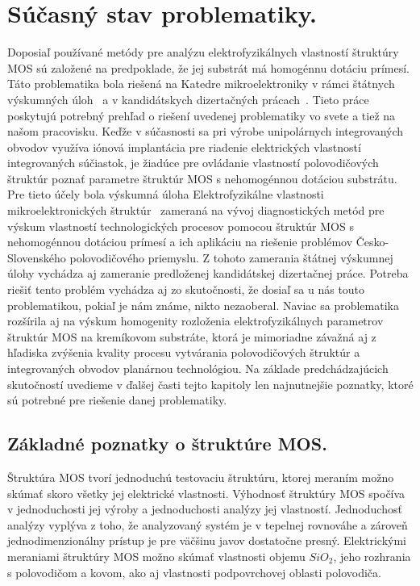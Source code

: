 
\chapter{Súčasný stav problematiky.}%
\label{Chapter1} %

Doposiaľ používané metódy pre analýzu elektrofyzikálnych vlastností
štruktúry MOS sú založené na predpoklade, že jej substrát má homogénnu
dotáciu prímesí. Táto problematika bola riešená na Katedre
mikroelektroniky v rámci štátnych výskumných úloh~\cite{1.1,1.2} a v
kandidátskych dizertačných prácach~\cite{1.5,1.6,1.7,1.8}. Tieto práce
poskytujú potrebný prehľad o riešení uvedenej problematiky vo svete a
tiež na našom pracovisku. Keďže v súčasnosti sa pri výrobe
unipolárnych integrovaných obvodov využíva iónová implantácia pre
riadenie elektrických vlastností integrovaných súčiastok, je žiadúce
pre ovládanie vlastností polovodičových štruktúr poznať parametre
štruktúr MOS s nehomogénnou dotáciou substrátu. Pre tieto účely bola
výskumná úloha Elektrofyzikálne vlastnosti mikroelektronických
štruktúr~\cite{1.3,1.4} zameraná na vývoj diagnostických metód pre
výskum vlastností technologických procesov pomocou štruktúr MOS s
nehomogénnou dotáciou prímesí a ich aplikáciu na riešenie problémov
Česko-Slovenského polovodičového priemyslu. Z tohoto zamerania štátnej
výskumnej úlohy vychádza aj zameranie predloženej kandidátskej
dizertačnej práce. Potreba riešiť tento problém vychádza aj zo
skutočnosti, že dosiaľ sa u nás touto problematikou, pokiaľ je nám
známe, nikto nezaoberal. Naviac sa problematika rozšírila aj na výskum
homogenity rozloženia elektrofyzikálnych parametrov štruktúr MOS na
kremíkovom substráte, ktorá je mimoriadne závažná aj z hľadiska
zvýšenia kvality procesu vytvárania polovodičových štruktúr a
integrovaných obvodov planárnou technológiou. Na základe
predchádzajúcich skutočností uvedieme v ďalšej časti tejto kapitoly
len najnutnejšie poznatky, ktoré sú potrebné pre riešenie danej
problematiky.

\section{Základné poznatky o štruktúre MOS.}

Štruktúra MOS tvorí jednoduchú testovaciu štruktúru, ktorej meraním
možno skúmať skoro všetky jej elektrické vlastnosti. Výhodnosť
štruktúry MOS spočíva v jednoduchosti jej výroby a jednoduchosti
analýzy jej vlastností. Jednoduchosť analýzy vyplýva z toho, že
analyzovaný systém je v tepelnej rovnováhe a zároveň
jednodimenzionálny prístup je pre väčšinu javov dostatočne
presný. Elektrickými meraniami štruktúry MOS možno skúmať vlastnosti
objemu $SiO_2$, jeho rozhrania s polovodičom a kovom, ako aj
vlastnosti podpovrchovej oblasti polovodiča.

